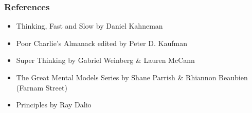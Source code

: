 \begin{frame}[fragile]\frametitle{References}
  \begin{itemize}
    \item Thinking, Fast and Slow by Daniel Kahneman
	\item Poor Charlie's Almanack edited by Peter D. Kaufman
	\item Super Thinking by Gabriel Weinberg \& Lauren McCann
	\item The Great Mental Models Series by Shane Parrish \& Rhiannon Beaubien (Farnam Street)
	\item Principles by Ray Dalio
  \end{itemize}

\end{frame}